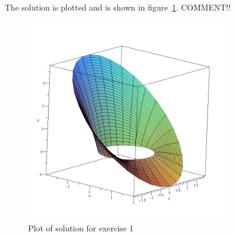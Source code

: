     The solution is plotted and is shown in figure~\ref{fig:q1-plot}. COMMENT!!
    \begin{figure}
        \centering
        \includegraphics[width=90mm]{q1-plot.png}
        \caption{Plot of solution for exercise 1}
        \label{fig:q1-plot}
    \end{figure}

